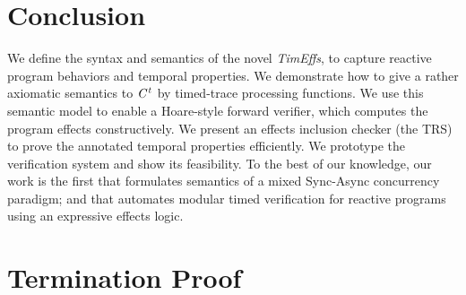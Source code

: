 \documentclass[acmsmall,10pt,review]{acmart}
\newcommand{\timedEffects}{\emph{TimEffs}}
\newcommand{\code}[1]{{\tt{\ensuremath{\m{#1}}}}}
\newcommand{\m}{\mathit}
\newcommand{\timedL}{\code{C^{t}}}
\begin{document}
{{{%





%
%


\section{Conclusion}
\label{sec:conclusion}
We define the syntax and semantics of the novel \timedEffects, to capture reactive program behaviors and  temporal properties. We demonstrate how to give a rather axiomatic semantics to \code{\timedL} by timed-trace processing functions. We use this semantic model to enable  a Hoare-style forward verifier,  which computes the program effects constructively.
We present an effects inclusion checker (the TRS) to prove the annotated temporal properties efficiently. We prototype the verification system and show its feasibility.
To the best of our knowledge, our work is the first that formulates semantics of a mixed Sync-Async concurrency paradigm; and that automates modular timed verification for reactive programs using an expressive effects logic. 










\appendix

\section{Termination Proof}  \label{proof:TerminationProof}

}}}
\end{document}
